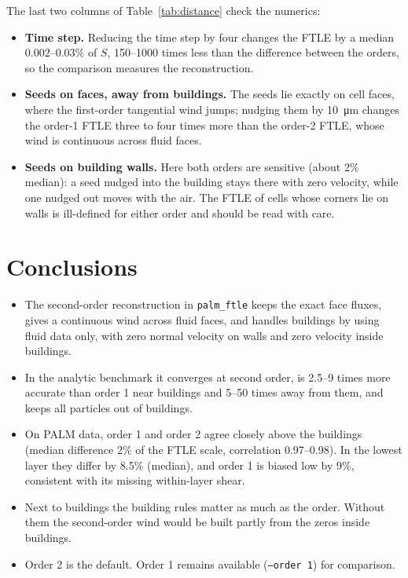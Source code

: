 \documentclass[11pt,a4paper]{article}
\begin{document}
The last two columns of Table~\ref{tab:distance} check the numerics:
\begin{itemize}
  \item \textbf{Time step.} Reducing the time step by four changes the
        FTLE by a median 0.002--0.03\% of $S$, 150--1000 times less than the
        difference between the orders, so the comparison measures the
        reconstruction.
  \item \textbf{Seeds on faces, away from buildings.} The seeds lie exactly
        on cell faces, where the first-order tangential wind jumps; nudging
        them by \SI{10}{\micro m} changes the order-1 FTLE three to four times
        more than the order-2 FTLE, whose wind is continuous across fluid
        faces.
  \item \textbf{Seeds on building walls.} Here both orders are sensitive (about
        2\% median): a seed nudged into the building stays there with zero
        velocity, while one nudged out moves with the air. The FTLE of cells
        whose corners lie on walls is ill-defined for either order and should
        be read with care.
\end{itemize}

\section{Conclusions}

\begin{itemize}
  \item The second-order reconstruction in \texttt{palm\_ftle} keeps the exact
        face fluxes, gives a continuous wind across fluid faces, and handles
        buildings by using fluid data only, with zero normal velocity on walls
        and zero velocity inside buildings.
  \item In the analytic benchmark it converges at second order, is 2.5--9 times
        more accurate than order 1 near buildings and 5--50 times away from
        them, and keeps all particles out of buildings.
  \item On PALM data, order 1 and order 2 agree closely above the buildings
        (median difference 2\% of the FTLE scale, correlation 0.97--0.98). In
        the lowest layer they differ by 8.5\% (median), and order 1 is biased
        low by 9\%, consistent with its missing within-layer shear.
  \item Next to buildings the building rules matter as much as the order.
        Without them the second-order wind would be built partly from the
        zeros inside buildings.
  \item Order 2 is the default. Order 1 remains available
        (\texttt{--order 1}) for comparison.
\end{itemize}
\end{document}
